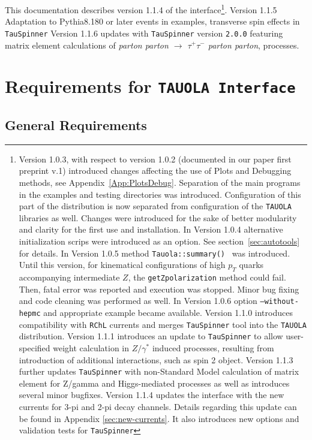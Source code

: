 \documentclass[]{Tauola_interface_design}
\begin{document}
This documentation describes version 1.1.4 of the interface\footnote{Version 1.0.3,
with respect to version 1.0.2 (documented in our paper first preprint v.1)
introduced changes affecting the use of Plots and Debugging methods, see
Appendix~\ref{App:PlotsDebug}. Separation of the main programs in the 
examples and testing directories was introduced. Configuration of this part 
of the distribution is now separated from configuration of the {\tt TAUOLA} 
libraries as well. Changes were introduced for the sake of better modularity
and clarity for the first use and installation. In Version 1.0.4 alternative initialization scrips were introduced 
as an option. See section~\ref{sec:autotools} for details. 
In Version 1.0.5 method {\tt Tauola::summary() } was introduced.
Until this  version, for kinematical configurations
of  high $p_T$ quarks accompanying 
intermediate $Z$, the {\tt getZpolarization} method  could fail. Then,   fatal error was reported 
and  execution was stopped.  Minor  
bug fixing and code cleaning was performed as well.
In Version 1.0.6 option {\tt --without-hepmc} and appropriate example 
became available.
Version 1.1.0 introduces compatibility with {\tt RChL} currents \cite{Shekhovtsova:2012ra} and merges
{\tt TauSpinner} \cite{Czyczula:2012ny} tool into the {\tt TAUOLA} distribution.
Version 1.1.1 introduces an update to {\tt TauSpinner} to allow user-specified
weight calculation in $Z/\gamma^*$ induced processes, resulting from
introduction of additional interactions, such as spin 2 object.
Version 1.1.3 further updates {\tt TauSpinner} with non-Standard Model
calculation of matrix element for Z/gamma and Higgs-mediated processes
as well as introduces several minor bugfixes.
Version 1.1.4 updates the interface with the new currents for 3-pi and 2-pi decay channels.
Details regarding this update can be found in Appendix \ref{sec:new-currents}.
It also introduces new options and validation tests for {\tt TauSpinner}}.
Version 1.1.5 Adaptation to Pythia8.180 or later events in examples, transverse spin effects in {\tt TauSpinner}
Version 1.1.6 updates with  {\tt TauSpinner} version {\tt 2.0.0} featuring
matrix element calculations of
{\it  parton parton $\to$ $\tau^+\tau^-$ parton parton},
processes.
\section{Requirements  for {\tt TAUOLA Interface} }

\subsection{General Requirements}
\label{sect:General}
\end{document}
